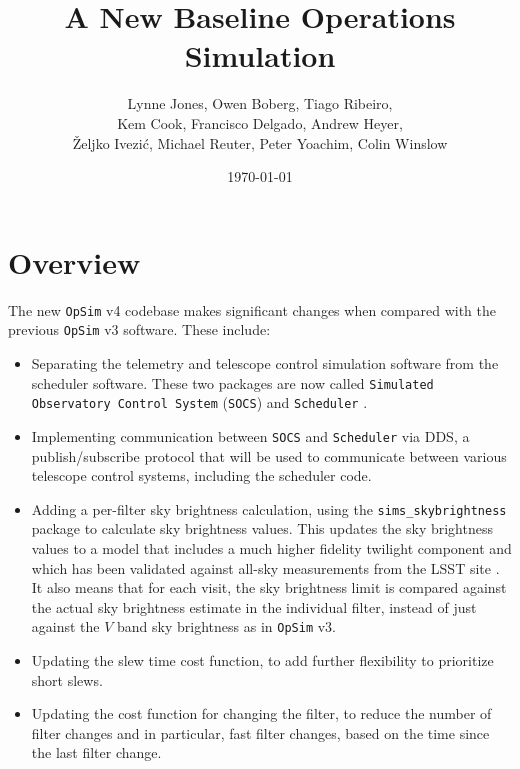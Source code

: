 \documentclass[DM,lsstdraft,authoryear,toc]{lsstdoc}
\title{A New Baseline Operations Simulation}
\author{%
Lynne Jones,
Owen Boberg,
Tiago Ribeiro, \\
Kem Cook,
Francisco Delgado,
Andrew Heyer, \\
\v{Z}eljko Ivezi\'{c},
Michael Reuter,
Peter Yoachim,
Colin Winslow
}
\date{\today}
\newcommand{\opsim}{\texttt{OpSim}\xspace}
\newcommand{\socs}{\texttt{SOCS}\xspace}
\newcommand{\sched}{\texttt{Scheduler}\xspace}
\newcommand{\simsky}{\texttt{sims\_skybrightness}\xspace}
\begin{document}
\maketitle

\section{Overview}

The new \opsim v4 codebase makes significant changes when compared with the previous \opsim v3 software. These include:
\begin{itemize}
\item Separating the telemetry and telescope control simulation software from the scheduler software. These two packages are now called \texttt{Simulated Observatory Control System} (\socs) \citep{2016SPIE.9911E..25R} and \texttt{Scheduler} \citep{2016SPIE.9910E..13D}.
\item Implementing communication between \socs and \sched via DDS, a publish/subscribe protocol that will be used to communicate between various telescope control systems, including the scheduler code.
\item Adding a per-filter sky brightness calculation, using the \simsky package to calculate sky brightness values. This updates the sky brightness values to a model that includes a much higher fidelity twilight component and which has been validated against all-sky measurements from the LSST site \citep{2016SPIE.9910E..1AY}. It also means that for each visit, the sky brightness limit is compared against the actual sky brightness estimate in the individual filter, instead of just against the $V$ band sky brightness as in \opsim v3.
\item Updating the slew time cost function, to add further flexibility to prioritize short slews.
\item Updating the cost function for changing the filter, to reduce the number of filter changes and in particular, fast filter changes, based on the time since the last filter change.

\end{itemize}
\end{document}
